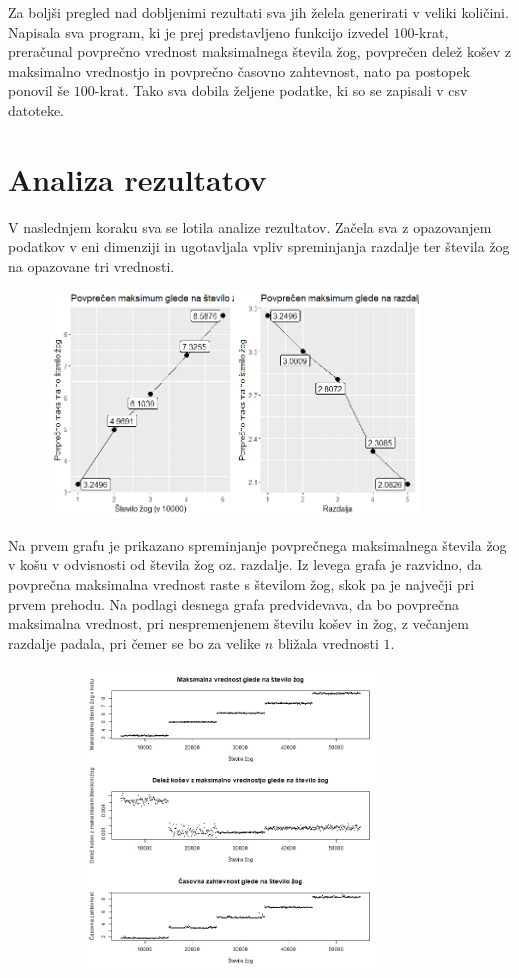 \documentclass[a4paper, 11pt]{article}
\begin{document}
Za boljši pregled nad dobljenimi rezultati sva jih želela generirati v veliki količini.
Napisala sva program, ki je prej predstavljeno funkcijo izvedel $100$-krat, preračunal povprečno vrednost maksimalnega števila žog, povprečen delež košev z maksimalno vrednostjo
in povprečno časovno zahtevnost, nato pa postopek ponovil še $100$-krat. 
Tako sva dobila željene podatke, ki so se zapisali v csv datoteke. 

\section{Analiza rezultatov}
V naslednjem koraku sva se lotila analize rezultatov. Začela sva z opazovanjem podatkov v eni dimenziji in ugotavljala vpliv spreminjanja razdalje ter števila žog na opazovane tri vrednosti.


\includegraphics[width=12cm, height=6cm]{povprecje_1dim.png}

Na prvem grafu je prikazano spreminjanje povprečnega maksimalnega števila žog v košu v odvisnosti od števila žog oz. razdalje.
Iz levega grafa je razvidno, da povprečna maksimalna vrednost raste s številom žog, skok pa je največji pri prvem prehodu.
Na podlagi desnega grafa predvidevava, da bo povprečna maksimalna vrednost, pri nespremenjenem številu košev in žog, z večanjem razdalje padala, pri čemer se bo za velike $n$ bližala vrednosti $1$.
\bigbreak


\includegraphics[width=12cm, height=8cm]{dim1_glede_na_stevilo_zog.png}
\end{document}

